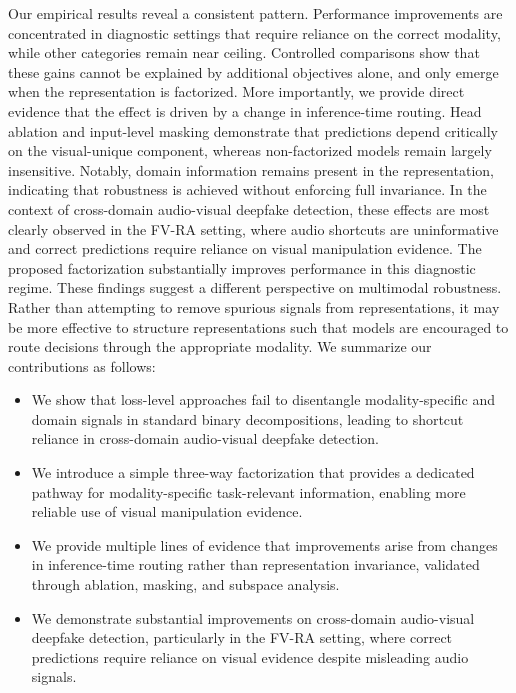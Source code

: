 \documentclass{article}
\begin{document}
Our empirical results reveal a consistent pattern. Performance improvements are concentrated in diagnostic settings that require reliance on the correct modality, while other categories remain near ceiling. Controlled comparisons show that these gains cannot be explained by additional objectives alone, and only emerge when the representation is factorized. More importantly, we provide direct evidence that the effect is driven by a change in inference-time routing. Head ablation and input-level masking demonstrate that predictions depend critically on the visual-unique component, whereas non-factorized models remain largely insensitive. Notably, domain information remains present in the representation, indicating that robustness is achieved without enforcing full invariance.
In the context of cross-domain audio-visual deepfake detection, these effects are most clearly observed in the FV-RA setting, where audio shortcuts are uninformative and correct predictions require reliance on visual manipulation evidence. The proposed factorization substantially improves performance in this diagnostic regime.
These findings suggest a different perspective on multimodal robustness. Rather than attempting to remove spurious signals from representations, it may be more effective to structure representations such that models are encouraged to route decisions through the appropriate modality.
We summarize our contributions as follows:
\begin{itemize}
    \item We show that loss-level approaches fail to disentangle modality-specific and domain signals in standard binary decompositions, leading to shortcut reliance in cross-domain audio-visual deepfake detection.
    
    \item We introduce a simple three-way factorization that provides a dedicated pathway for modality-specific task-relevant information, enabling more reliable use of visual manipulation evidence.
    
    \item We provide multiple lines of evidence that improvements arise from changes in inference-time routing rather than representation invariance, validated through ablation, masking, and subspace analysis.
    
    \item We demonstrate substantial improvements on cross-domain audio-visual deepfake detection, particularly in the FV-RA setting, where correct predictions require reliance on visual evidence despite misleading audio signals.
\end{itemize}
\end{document}
